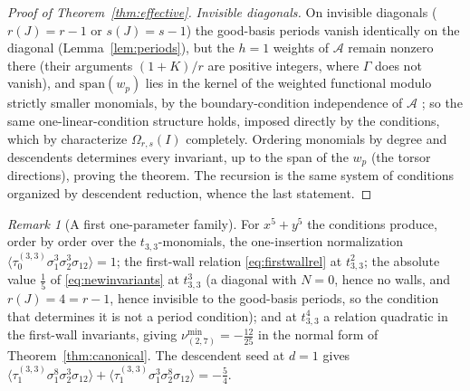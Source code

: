 \documentclass[11pt]{amsart}
\theoremstyle{definition}
\theoremstyle{remark}
\newtheorem{remark}[theorem]{Remark}
\newcommand{\Ascr}{\mathcal{A}}
\newcommand{\Om}{\Omega_{r,s}}
\begin{document}
\begin{proof}[Proof of Theorem~\ref{thm:effective}]
\emph{Invisible diagonals.}
On invisible
diagonals ($r(J)=r-1$ or $s(J)=s-1$) the good-basis periods vanish identically
on the diagonal (Lemma~\ref{lem:periods}), but the $h=1$ weights of $\Ascr$
remain nonzero there (their arguments $(1+K)/r$ are positive integers,
where $\Gamma$ does not vanish), and $\mathrm{span}(w_{p})$ lies in the
kernel of the weighted functional modulo strictly smaller monomials, by the
boundary-condition independence of $\Ascr$ \cite[Thm.~5.4]{GKT}; so the same
one-linear-condition structure holds, imposed directly by the conditions,
which by \cite[Cor.~5.14]{GKT} characterize $\Om(I)$ completely. Ordering monomials by degree and descendents determines every
invariant, up to the span of the $w_{p}$ (the torsor directions), proving the
theorem. The recursion \cite[Thm.~0.5]{GKT} is the same system of conditions
organized by descendent reduction, whence the last statement.
\end{proof}

\begin{remark}[A first one-parameter family]
\label{rem:tower}
For $x^{5}+y^{5}$ the conditions produce, order by order over the
$t_{3,3}$-monomials, the one-insertion normalization
$\langle\tau_{0}^{(3,3)}\sigma_{1}^{3}\sigma_{2}^{3}\sigma_{12}\rangle=1$; the
first-wall relation \eqref{eq:firstwallrel} at $t_{3,3}^{2}$; the absolute value
$\tfrac15$ of \eqref{eq:newinvariants} at $t_{3,3}^{3}$ (a diagonal with $N=0$,
hence no walls, and $r(J)=4=r{-}1$, hence invisible to the good-basis periods,
so the condition that determines it is not a period condition); and at $t_{3,3}^{4}$
a relation quadratic in the first-wall invariants, giving
$\nu^{\min}_{(2,7)}=-\tfrac{12}{25}$ in the normal form of
Theorem~\ref{thm:canonical}. The descendent seed at $d=1$ gives
$\langle\tau_{1}^{(3,3)}\sigma_{1}^{8}\sigma_{2}^{3}\sigma_{12}\rangle
+\langle\tau_{1}^{(3,3)}\sigma_{1}^{3}\sigma_{2}^{8}\sigma_{12}\rangle
=-\tfrac54$.
\end{remark}
\end{document}
